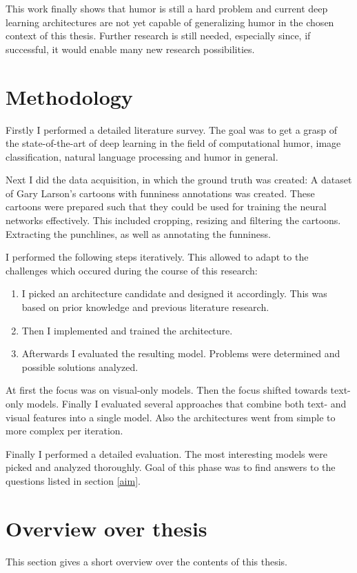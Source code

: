 \documentclass[draft,final,oneside]{vutinfth} %
\begin{document}
This work finally shows that humor is still a hard problem and current deep learning architectures are not yet capable of generalizing humor in the chosen context of this thesis. Further research is still needed, especially since, if successful, it would enable many new research possibilities.


\section{Methodology}

Firstly I performed a detailed literature survey. The goal was to get a grasp of the state-of-the-art of deep learning in the field of computational humor, image classification, natural language processing and humor in general.

Next I did the data acquisition, in which the ground truth was created: A dataset of Gary Larson's cartoons with funniness annotations was created. These cartoons were prepared such that they could be used for training the neural networks effectively. This included cropping, resizing and filtering the cartoons. Extracting the punchlines, as well as annotating the funniness.

I performed the following steps iteratively. This allowed to adapt to the challenges which occured during the course of this research:

\begin{enumerate}

\item I picked an architecture candidate and designed it accordingly. This was based on prior knowledge and previous literature research.
\item Then I implemented and trained the architecture.
\item Afterwards I evaluated the resulting model. Problems were determined and possible solutions analyzed.

\end{enumerate}

At first the focus was on visual-only models. Then the focus shifted towards text-only models. Finally I evaluated several approaches that combine both text- and visual features into a single model. Also the architectures went from simple to more complex per iteration.

Finally I performed a detailed evaluation. The most interesting models were picked and analyzed thoroughly. Goal of this phase was to find answers to the questions listed in section \ref{aim}.
\section{Overview over thesis}
This section gives a short overview over the contents of this thesis.
\end{document}
